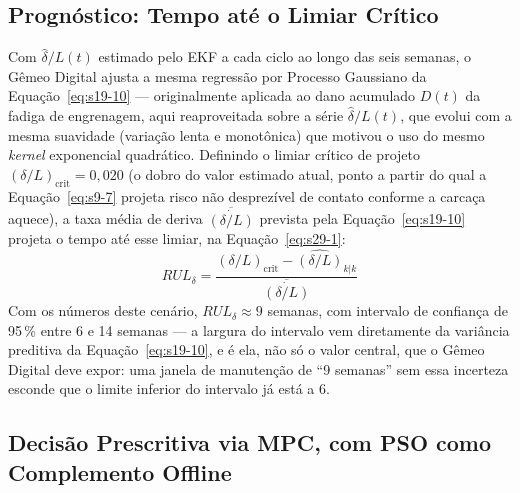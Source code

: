 \documentclass[12pt,a4paper]{article}
\numberwithin{equation}{section}
\numberwithin{table}{section}
\numberwithin{figure}{section}
\begin{document}
{\subsection{Prognóstico: Tempo até o Limiar Crítico}

Com $\hat\delta/L(t)$ estimado pelo EKF a cada ciclo ao longo das seis semanas, o Gêmeo Digital ajusta a mesma regressão por Processo Gaussiano da Equação~\eqref{eq:s19-10} — originalmente aplicada ao dano acumulado $D(t)$ da fadiga de engrenagem, aqui reaproveitada sobre a série $\hat\delta/L(t)$, que evolui com a mesma suavidade (variação lenta e monotônica) que motivou o uso do mesmo \textit{kernel} exponencial quadrático. Definindo o limiar crítico de projeto $(\delta/L)_{\text{crit}} = 0{,}020$ (o dobro do valor estimado atual, ponto a partir do qual a Equação~\eqref{eq:s9-7} projeta risco não desprezível de contato conforme a carcaça aquece), a taxa média de deriva $\overline{\dot{(\delta/L)}}$ prevista pela Equação~\eqref{eq:s19-10} projeta o tempo até esse limiar, na Equação~\eqref{eq:s29-1}:
\begin{equation}\label{eq:s29-1}
 RUL_\delta = \frac{(\delta/L)_{\text{crit}} - \hat{(\delta/L)}_{k|k}}{\overline{\dot{(\delta/L)}}}
\end{equation}
Com os números deste cenário, $RUL_\delta \approx 9$ semanas, com intervalo de confiança de 95\,\% entre 6 e 14 semanas — a largura do intervalo vem diretamente da variância preditiva da Equação~\eqref{eq:s19-10}, e é ela, não só o valor central, que o Gêmeo Digital deve expor: uma janela de manutenção de ``9 semanas'' sem essa incerteza esconde que o limite inferior do intervalo já está a 6.

\subsection{Decisão Prescritiva via MPC, com PSO como Complemento Offline}

}
\end{document}
